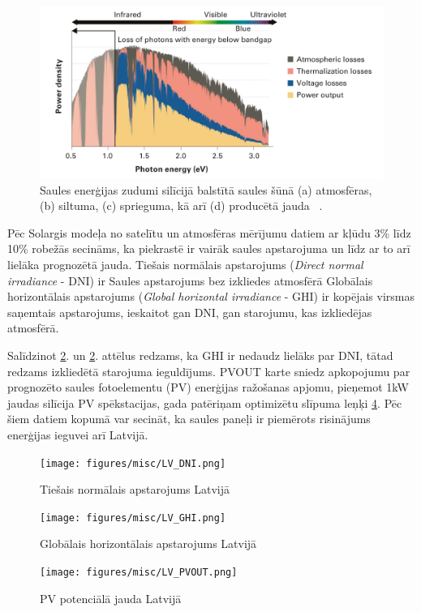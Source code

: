 \begin{figure}[h]
    \centering
    \includegraphics[width=\linewidth]{figures/misc/energyLosses.png}
    \caption{Saules enerģijas zudumi silīcijā balstītā saules šūnā (a) atmosfēras, (b) siltuma, (c) sprieguma, kā arī (d) producētā jauda  ~\cite{Sivaram}.}
    \label{fig:zudumi}
\end{figure}


Pēc Solargis modeļa no satelītu un atmosfēras mērījumu datiem ar kļūdu 3\% līdz 10\% robežās secināms, ka piekrastē ir vairāk saules apstarojuma un līdz ar to arī lielāka prognozētā jauda. 
Tiešais normālais apstarojums (\textit{Direct normal irradiance} - DNI) ir Saules apstarojums bez izkliedes atmosfērā
Globālais horizontālais apstarojums (\textit{Global horizontal irradiance} - GHI) ir kopējais virsmas saņemtais apstarojums, ieskaitot gan DNI, gan starojumu, kas izkliedējas atmosfērā.

Salīdzinot \ref{fig:lv_DNI}. un  \ref{fig:lv_DNI}. attēlus redzams, ka GHI ir nedaudz lielāks par DNI, tātad redzams izkliedētā starojuma ieguldījums. PVOUT karte sniedz apkopojumu par prognozēto saules fotoelementu (PV) enerģijas ražošanas apjomu, pieņemot 1kW jaudas silīcija PV spēkstacijas, gada patēriņam optimizētu slīpuma leņķi \ref{fig:lv_PVOUT}. Pēc šiem datiem kopumā var secināt, ka saules paneļi ir piemērots risinājums enerģijas ieguvei arī Latvijā.


\begin{figure}[h]
    \centering
    \texttt{[image: figures/misc/LV\_DNI.png]}
    \caption{Tiešais normālais apstarojums Latvijā \cite{solargis}}
    \label{fig:lv_DNI}
\end{figure}
\begin{figure}[h]
    \centering
    \texttt{[image: figures/misc/LV\_GHI.png]}
    \caption{Globālais horizontālais apstarojums Latvijā \cite{solargis}}
    \label{fig:lv_GHI}
\end{figure}
\begin{figure}[h]
    \centering
    \texttt{[image: figures/misc/LV\_PVOUT.png]}
    \caption{PV potenciālā jauda Latvijā \cite{solargis}}
    \label{fig:lv_PVOUT}
\end{figure}